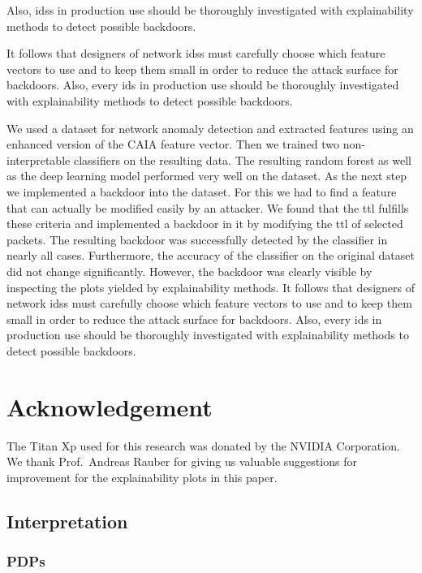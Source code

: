\documentclass[10pt,sigconf,letterpaper,dvipsnames]{acmart}
\begin{document}
Also, \glspl{ids} in production use should be thoroughly investigated with explainability methods to detect possible backdoors.

It follows that designers of network \glspl{ids} must carefully choose which feature vectors to use and to keep them small in order to reduce the attack surface for backdoors. Also, every \gls{ids} in production use should be thoroughly investigated with explainability methods to detect possible backdoors.

We used a dataset for network anomaly detection and extracted features using an enhanced version of the CAIA feature vector. Then we trained two non-interpretable classifiers on the resulting data. The resulting random forest as well as the deep learning model performed very well on the dataset. As the next step we implemented a backdoor into the dataset. For this we had to find a feature that can actually be modified easily by an attacker. We found that the \gls{ttl} fulfills these criteria and implemented a backdoor in it by modifying the  \gls{ttl} of selected packets. The resulting backdoor was successfully detected by the classifier in nearly all cases. Furthermore, the accuracy of the classifier on the original dataset did not change significantly. However, the backdoor was clearly visible by inspecting the plots yielded by explainability methods. It follows that designers of network \glspl{ids} must carefully choose which feature vectors to use and to keep them small in order to reduce the attack surface for backdoors. Also, every \gls{ids} in production use should be thoroughly investigated with explainability methods to detect possible backdoors.

\section*{Acknowledgement}
The Titan Xp used for this research was donated by the NVIDIA Corporation. We thank Prof.~Andreas Rauber for giving us valuable suggestions for improvement for the explainability plots in this paper. 




\subsection{Interpretation}
\subsubsection{PDPs}
\end{document}
